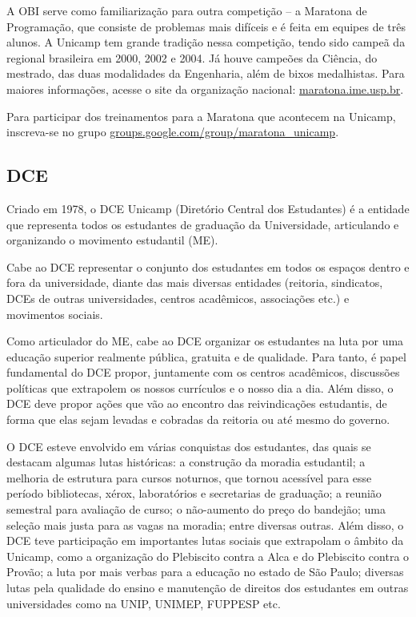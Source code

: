 A OBI serve como familiarização para outra competição -- a Maratona de Programação, que consiste de
problemas mais difíceis e é feita
em equipes de três alunos. A Unicamp tem grande tradição nessa competição,
tendo sido campeã da regional brasileira em
2000, 2002 e 2004. Já houve campeões da Ciência, do mestrado, das duas
modalidades da Engenharia, além de bixos medalhistas. Para maiores informações,
acesse o site da organização nacional: \url{maratona.ime.usp.br}.

Para participar dos treinamentos para a Maratona que acontecem na Unicamp,
inscreva-se no grupo \url{groups.google.com/group/maratona_unicamp}.

\subsection{DCE}

Criado em 1978, o DCE Unicamp (Diretório Central dos Estudantes) é a entidade que
representa todos os estudantes de graduação da Universidade, articulando
e organizando o movimento estudantil (ME).

Cabe ao DCE representar o conjunto dos
estudantes em todos os espaços dentro e fora da universidade, diante das mais
diversas entidades (reitoria, sindicatos, DCEs de outras universidades, centros
acadêmicos, associações etc.) e movimentos sociais.

Como articulador do ME, cabe ao DCE organizar os estudantes na luta por uma
educação superior realmente pública, gratuita e de qualidade. Para tanto,
é papel fundamental do DCE propor, juntamente com os centros acadêmicos,
discussões políticas que extrapolem os nossos currículos e o nosso dia a dia.
Além disso, o DCE deve propor ações que vão ao encontro das reivindicações
estudantis, de forma que elas sejam levadas e cobradas da reitoria ou até mesmo
do governo.

O DCE esteve envolvido em várias conquistas dos estudantes, das quais se
destacam algumas lutas históricas: a construção da moradia estudantil; a melhoria
de estrutura para cursos noturnos, que tornou acessível para esse período
bibliotecas, xérox, laboratórios e secretarias de graduação; a reunião semestral
para avaliação de curso; o não-aumento do preço do bandejão; uma seleção mais
justa para as vagas na moradia; entre diversas outras. Além disso, o DCE teve
participação em importantes lutas sociais que extrapolam o âmbito da Unicamp,
como a organização do Plebiscito contra a Alca e do Plebiscito contra o Provão;
a luta por mais verbas para a educação no estado de São Paulo; diversas lutas
pela qualidade do ensino e manutenção de direitos dos estudantes em outras
universidades como na UNIP, UNIMEP, FUPPESP etc.

